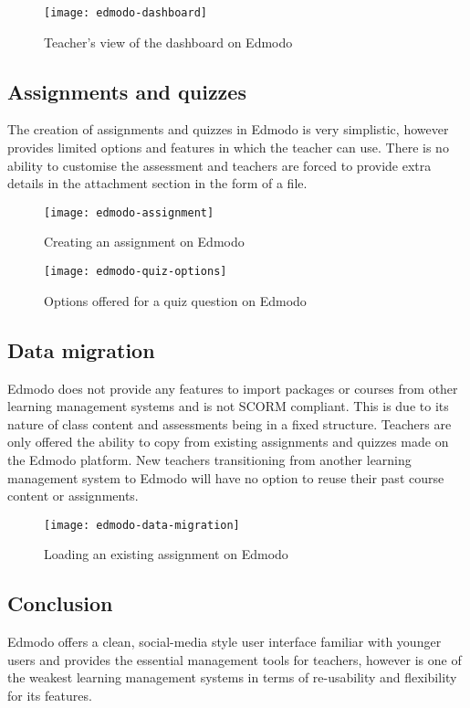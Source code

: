 \begin{figure}[h!]
\centering
\texttt{[image: edmodo-dashboard]}
\caption{Teacher's view of the dashboard on Edmodo}
\end{figure}


\subsection{Assignments and quizzes}
The creation of assignments and quizzes in Edmodo is very simplistic, however provides limited options and features in which the teacher can use. There is no ability to customise the assessment and teachers are forced to provide extra details in the attachment section in the form of a file.

\begin{figure}[h!]
\centering
\texttt{[image: edmodo-assignment]}
\caption{Creating an assignment on Edmodo}
\end{figure}

\begin{figure}[h!]
\centering
\texttt{[image: edmodo-quiz-options]}
\caption{Options offered for a quiz question on Edmodo}
\end{figure}

\subsection{Data migration}
Edmodo does not provide any features to import packages or courses from other learning management systems and is not SCORM compliant. This is due to its nature of class content and assessments being in a fixed structure. Teachers are only offered the ability to copy from existing assignments and quizzes made on the Edmodo platform. New teachers transitioning from another learning management system to Edmodo will have no option to reuse their past course content or assignments.

\begin{figure}[h!]
\centering
\texttt{[image: edmodo-data-migration]}
\caption{Loading an existing assignment on Edmodo}
\end{figure}

\subsection{Conclusion}
Edmodo offers a clean, social-media style user interface familiar with younger users and provides the essential management tools for teachers, however is one of the weakest learning management systems in terms of re-usability and flexibility for its features.